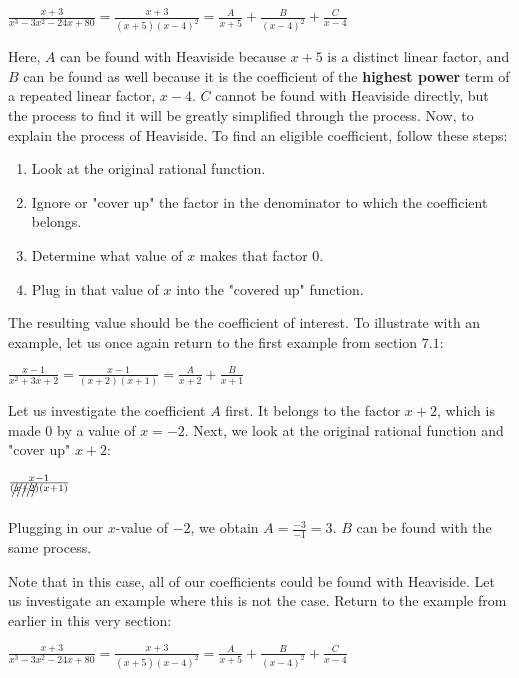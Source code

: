 \documentclass[11pt]{article}
\begin{document}
\begin{center}
$\frac{x+3}{x^3-3x^2-24x+80} = \frac{x+3}{(x+5)(x-4)^2} = \frac{A}{x+5} + \frac{B}{(x-4)^2} + \frac{C}{x-4}$
\end{center}

Here, $A$ can be found with Heaviside because $x+5$ is a distinct linear factor, and $B$ can be found as well because it is the coefficient of the \textbf{highest power} term of a repeated linear factor, $x-4$. $C$ cannot be found with Heaviside directly, but the process to find it will be greatly simplified through the process. Now, to explain the process of Heaviside. To find an eligible coefficient, follow these steps:

\begin{enumerate}
  \item Look at the original rational function.
  \item Ignore or "cover up" the factor in the denominator to which the coefficient belongs.
  \item Determine what value of $x$ makes that factor $0$.
  \item Plug in that value of $x$ into the "covered up" function.
\end{enumerate}

The resulting value should be the coefficient of interest. To illustrate with an example, let us once again return to the first example from section $7.1$:

\begin{center}
$\frac{x-1}{x^2+3x+2} = \frac{x-1}{(x+2)(x+1)} = \frac{A}{x+2} + \frac{B}{x+1}$
\end{center}

Let us investigate the coefficient $A$ first. It belongs to the factor $x+2$, which is made $0$ by a value of $x=-2$. Next, we look at the original rational function and "cover up" $x+2$:

\begin{center}
$\frac{x-1}{\xout{(x+2)}(x+1)}$
\end{center}

Plugging in our $x$-value of $-2$, we obtain $A = \frac{-3}{-1} = 3$. $B$ can be found with the same process.

Note that in this case, all of our coefficients could be found with Heaviside. Let us investigate an example where this is not the case. Return to the example from earlier in this very section:

\begin{center}
$\frac{x+3}{x^3-3x^2-24x+80} = \frac{x+3}{(x+5)(x-4)^2} = \frac{A}{x+5} + \frac{B}{(x-4)^2} + \frac{C}{x-4}$
\end{center}
\end{document}
